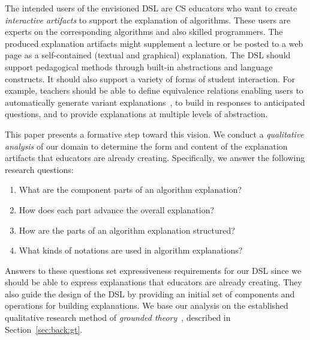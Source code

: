 \documentclass[sigconf]{acmart}
\begin{document}
The intended users of the envisioned DSL are CS educators who want to create
\emph{interactive artifacts} to support the explanation of algorithms. These
users are experts on the corresponding algorithms and also skilled
programmers. The produced explanation artifacts might supplement a lecture or
be posted to a web page as a self-contained (textual and graphical)
explanation.
%
The DSL should support pedagogical methods through built-in
abstractions and language constructs. It should also support a variety of forms
of student interaction. For example, teachers should be able to define
equivalence relations enabling users to automatically generate variant
explanations~\cite{EW13jvlc}, to build in responses to anticipated
questions, and to provide explanations at multiple levels of abstraction.


This paper presents a formative step toward this vision. We conduct a
\emph{qualitative analysis} of our domain to determine the form and content of
the explanation artifacts that educators are already creating.
%
Specifically, we answer the following research questions:
%
\begin{enumerate}[label=RQ\arabic*.,ref=RQ\arabic*,leftmargin=*]

\item \label{rq:what}
%
What are the component parts of an algorithm explanation?

\item \label{rq:how}
%
How does each part advance the overall explanation?

\item \label{rq:structure}
%
How are the parts of an algorithm explanation structured?

\item \label{rq:notations}
%
What kinds of notations are used in algorithm explanations?

\end{enumerate}
%
Answers to these questions set expressiveness requirements for our DSL since we
should be able to express explanations that educators are already creating.
They also guide the design of the DSL by providing an initial set of components
and operations for building explanations.
%
We base our analysis on the established qualitative research method of
\emph{grounded theory}~\cite{Strauss67discoveryof}, described in
Section~\ref{sec:back:gt}.
\end{document}
